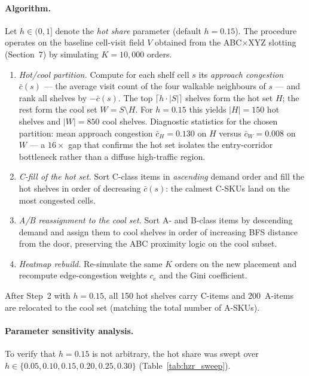 \documentclass[12pt,a4paper]{article}
\begin{document}
\paragraph{Algorithm.}
Let $h \in (0,1]$ denote the \emph{hot share} parameter (default $h = 0.15$).
The procedure operates on the baseline cell-visit field $V$ obtained from the
ABC$\times$XYZ slotting (Section~7) by simulating $K=10{,}000$ orders.
\begin{enumerate}
  \item \emph{Hot/cool partition.}
        Compute for each shelf cell $s$ its \emph{approach congestion} $\bar{c}(s)$
        --- the average visit count of the four walkable neighbours of $s$ ---
        and rank all shelves by $-\bar{c}(s)$.
        The top $\lceil h \cdot |S| \rceil$ shelves form the hot set $H$;
        the rest form the cool set $W = S \setminus H$.
        For $h = 0.15$ this yields $|H| = 150$ hot shelves and $|W| = 850$ cool shelves.
        Diagnostic statistics for the chosen partition: mean approach congestion
        $\bar{c}_H = 0.130$ on $H$ versus $\bar{c}_W = 0.008$ on $W$ --- a $16\times$
        gap that confirms the hot set isolates the entry-corridor bottleneck rather
        than a diffuse high-traffic region.
  \item \emph{C-fill of the hot set.}
        Sort C-class items in \emph{ascending} demand order
        and fill the hot shelves in order of decreasing $\bar{c}(s)$:
        the calmest C-SKUs land on the most congested cells.
  \item \emph{A/B reassignment to the cool set.}
        Sort A- and B-class items by descending demand and assign them to cool shelves
        in order of increasing BFS distance from the door, preserving the ABC
        proximity logic on the cool subset.
  \item \emph{Heatmap rebuild.}
        Re-simulate the same $K$ orders on the new placement and recompute
        edge-congestion weights $c_e$ and the Gini coefficient.
\end{enumerate}
After Step~2 with $h = 0.15$, all 150 hot shelves carry C-items and 200~A-items
are relocated to the cool set (matching the total number of A-SKUs).

\paragraph{Parameter sensitivity analysis.}
To verify that $h = 0.15$ is not arbitrary, the hot share was swept over
$h \in \{0.05, 0.10, 0.15, 0.20, 0.25, 0.30\}$
(Table~\ref{tab:hzr_sweep}).
\end{document}
